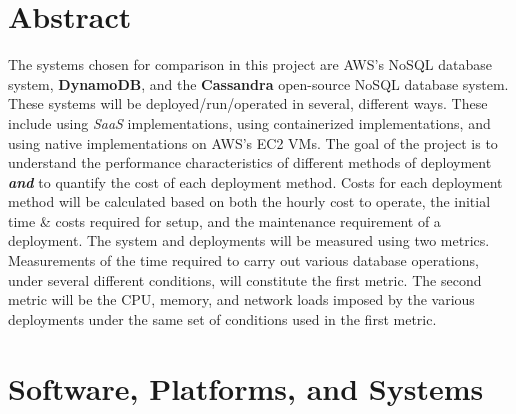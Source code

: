 \documentclass{article}[10pt]
\numberwithin{equation}{section}
\begin{document}
\begin{multicols}{2}
\begin{flushleft}


\section*{Abstract}
\begin{spacing}{1.4}
The systems chosen for comparison in this project are AWS's NoSQL database system, \textbf{DynamoDB}, and the \textbf{Cassandra} open-source NoSQL database system.  These systems will be deployed/run/operated in several, different ways.  These include using \emph{SaaS} implementations, using containerized implementations, and using native implementations on AWS's EC2 VMs.  The goal of the project is to understand the performance characteristics of different methods of deployment \textbf{\emph{and}} to quantify the cost of each deployment method.  Costs for each deployment method will be calculated based on both the hourly cost to operate, the initial time \& costs required for setup, and the maintenance requirement of a deployment.  The system and deployments will be measured using two metrics.  Measurements of the time required to carry out various database operations, under several different conditions, will constitute the first metric.  The second metric will be the CPU, memory, and network loads imposed by the various deployments under the same set of conditions used in the first metric.  
\end{spacing}

\section{Software, Platforms, and Systems}
























\end{flushleft}
\end{multicols}












































\end{document}
